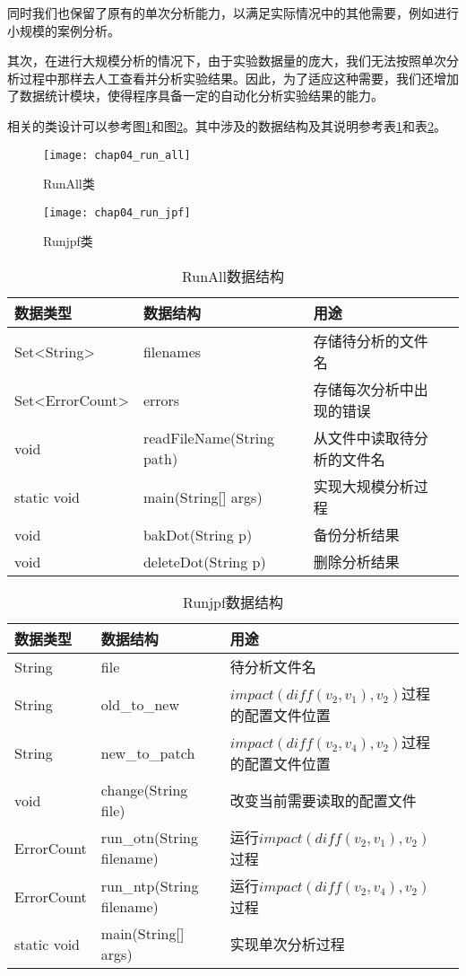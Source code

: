 同时我们也保留了原有的单次分析能力，以满足实际情况中的其他需要，例如进行小规模的案例分析。

其次，在进行大规模分析的情况下，由于实验数据量的庞大，我们无法按照单次分析过程中那样去人工查看并分析实验结果。因此，为了适应这种需要，我们还增加了数据统计模块，使得程序具备一定的自动化分析实验结果的能力。

相关的类设计可以参考图\ref {class_run_all}和图\ref {class_run_jpf}。其中涉及的数据结构及其说明参考表\ref {run_all_data}和表\ref {run_jpf_data}。

\begin{figure}[H]
	\centering
	\texttt{[image: chap04\_run\_all]}
	\caption {RunAll类}
	\label {class_run_all}	
\end{figure}

\begin{figure}[H]
	\centering
	\texttt{[image: chap04\_run\_jpf]}
	\caption {Runjpf类}
	\label {class_run_jpf}	
\end{figure}

\begin{table}
	\caption{RunAll数据结构}
	\label{run_all_data}
	\centering
	\begin{tabular}{lllc}
		\toprule[1.5pt]
		{\heiti 数据类型} &{\heiti 数据结构} & {\heiti 用途} \\\midrule[1pt]
		Set<String> & filenames & 存储待分析的文件名 \\
		Set<ErrorCount> & errors & 存储每次分析中出现的错误 \\
		void & readFileName(String path) & 从文件中读取待分析的文件名\\
		static void & main(String[] args) & 实现大规模分析过程\\
		void & bakDot(String p) & 备份分析结果\\
		void & deleteDot(String p) & 删除分析结果\\
		\bottomrule[1.5pt]
	\end{tabular}
\end{table}

\begin{table}
	\caption{Runjpf数据结构}
	\label{run_jpf_data}
	\centering
	\begin{tabular}{lllc}
		\toprule[1.5pt]
		{\heiti 数据类型} &{\heiti 数据结构} & {\heiti 用途} \\\midrule[1pt]
		String & file & 待分析文件名\\
		String & old\_to\_new & $impact(diff(v_2,v_1),v_2)$过程的配置文件位置\\
		String & new\_to\_patch & $impact(diff(v_2,v_4),v_2)$过程的配置文件位置\\
		void & change(String file) & 改变当前需要读取的配置文件\\
		ErrorCount & run\_otn(String filename) & 运行$impact(diff(v_2,v_1),v_2)$过程 \\
		ErrorCount & run\_ntp(String filename) & 运行$impact(diff(v_2,v_4),v_2)$过程  \\
		static void & main(String[] args) & 实现单次分析过程\\
		\bottomrule[1.5pt]
	\end{tabular}
\end{table}


